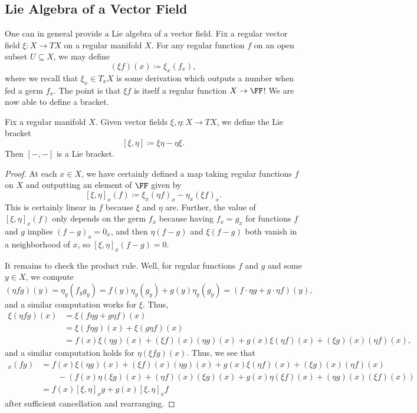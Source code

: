 \documentclass[../notes.tex]{subfiles}
\begin{document}
\subsection{Lie Algebra of a Vector Field}
One can in general provide a Lie algebra of a vector field. Fix a regular vector field $\xi\colon X\to TX$ on a regular manifold $X$. For any regular function $f$ on an open subset $U\subseteq X$, we may define
\[(\xi f)(x)\coloneqq\xi_x(f_x),\]
where we recall that $\xi_x\in T_xX$ is some derivation which outputs a number when fed a germ $f_x$. The point is that $\xi f$ is itself a regular function $X\to\FF$! We are now able to define a bracket.
\begin{proposition}
	Fix a regular manifold $X$. Given vector fields $\xi,\eta\colon X\to TX$, we define the Lie bracket
	\[[\xi,\eta]\coloneqq\xi\eta-\eta\xi.\]
	Then $[-,-]$ is a Lie bracket.
\end{proposition}
\begin{proof}
	At each $x\in X$, we have certainly defined a map taking regular functions $f$ on $X$ and outputting an element of $\FF$ given by
	\[[\xi,\eta]_x(f)\coloneqq\xi_x(\eta f)_x-\eta_x(\xi f)_x.\]
	This is certainly linear in $f$ because $\xi$ and $\eta$ are. Further, the value of $[\xi,\eta]_x(f)$ only depends on the germ $f_x$ because having $f_x=g_x$ for functions $f$ and $g$ implies $(f-g)_x=0_x$, and then $\eta(f-g)$ and $\xi(f-g)$ both vanish in a neighborhood of $x$, so $[\xi,\eta]_x(f-g)=0$.
	
	It remains to check the product rule. Well, for regular functions $f$ and $g$ and some $y\in X$, we compute
	\[(\eta fg)(y)=\eta_y(f_yg_y)=f(y)\eta_y(g_y)+g(y)\eta_y(g_y)=(f\cdot\eta g+g\cdot\eta f)(y),\]
	and a similar computation works for $\xi$. Thus,
	\begin{align*}
		\xi(\eta fg)(x) &= \xi(f\eta g+g\eta f)(x) \\
		&= \xi(f\eta g)(x)+\xi(g\eta f)(x) \\
		&= f(x)\xi(\eta g)(x)+(\xi f)(x)(\eta g)(x)+g(x)\xi(\eta f)(x)+(\xi g)(x)(\eta f)(x),
	\end{align*}
	and a similar computation holds for $\eta(\xi fg)(x)$. Thus, we see that
	\begin{align*}
		[\xi,\eta]_x(fg) &= f(x)\xi(\eta g)(x)+(\xi f)(x)(\eta g)(x)+g(x)\xi(\eta f)(x)+(\xi g)(x)(\eta f)(x) \\
		&\qquad-\left(f(x)\eta(\xi g)(x)+(\eta f)(x)(\xi g)(x)+g(x)\eta(\xi f)(x)+(\eta g)(x)(\xi f)(x)\right) \\
		&= f(x)[\xi,\eta]_xg+g(x)[\xi,\eta]_xf
	\end{align*}
	after sufficient cancellation and rearranging.
\end{proof}
\end{document}
